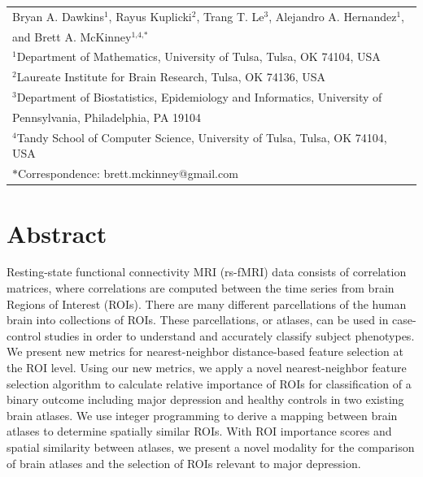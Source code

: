 \documentclass[10pt,letterpaper]{article}\usepackage[]{graphicx}\usepackage[]{color}
\begin{document}
\vspace*{0.2in}

{\Large
\textbf{} %
}
\begin{center}
  \begin{tabular}{l}
  Bryan A. Dawkins$^{\text{1}}$, Rayus Kuplicki$^{\text{2}}$, Trang T. Le$^{\text{3}}$, Alejandro A. Hernandez$^{\text{1}}$, \\
  and Brett A. McKinney$^{\text{1,4,}*}$ \\
  $^{\text{1}}$Department of Mathematics, University of Tulsa, Tulsa, OK 74104, USA \\
  $^{\text{2}}$Laureate Institute for Brain Research, Tulsa, OK 74136, USA \\
  $^{\text{3}}$Department of Biostatistics, Epidemiology and Informatics, University of \\
  \hphantom{2}Pennsylvania, Philadelphia, PA 19104 \\
  $^{\text{4}}$Tandy School of Computer Science, University of Tulsa, Tulsa, OK 74104, USA\\
  $*$Correspondence: brett.mckinney@gmail.com
  \end{tabular}
\end{center}


\section*{Abstract}
Resting-state functional connectivity MRI (rs-fMRI) data consists of correlation matrices, where correlations are computed between the time series from brain Regions of Interest (ROIs). There are many different parcellations of the human brain into collections of ROIs. These parcellations, or atlases, can be used in case-control studies in order to understand and accurately classify subject phenotypes. We present new metrics for nearest-neighbor distance-based feature selection at the ROI level. Using our new metrics, we apply a novel nearest-neighbor feature selection algorithm to calculate relative importance of ROIs for classification of a binary outcome including major depression and healthy controls in two existing brain atlases. We use integer programming to derive a mapping between brain atlases to determine spatially similar ROIs. With ROI importance scores and spatial similarity between atlases, we present a novel modality for the comparison of brain atlases and the selection of ROIs relevant to major depression.
\linenumbers
\end{document}
